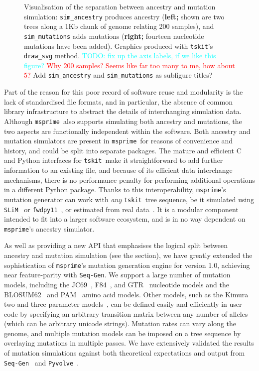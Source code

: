 \documentclass{article}
\newcommand{\msprime}[0]{\texttt{msprime}}
\newcommand{\tskit}[0]{\texttt{tskit}}
\newcommand{\SLiM}[0]{\texttt{SLiM}}
\newcommand{\fwdpy}[0]{\texttt{fwdpy11}}
\newcommand{\SeqGen}[0]{\texttt{Seq-Gen}}
\newcommand{\Pyvolve}[0]{\texttt{Pyvolve}}
\newcommand{\jkcomment}[1]{\textcolor{red}{#1}}
\newcommand{\plrcomment}[1]{\textcolor{cyan}{#1}}
\newcommand{\grgcomment}[1]{\textcolor{yellow!60!red}{#1}}
\begin{document}
\begin{figure}
    \caption{
        \label{fig-mutated-trees}
        Visualisation of the separation between ancestry and mutation simulation:
        \texttt{sim\_ancestry} produces ancestry
        (\textbf{left;} shown are two trees along a 1Kb chunk of genome
        relating 200 samples),
        and \texttt{sim\_mutations} adds mutations
        (\textbf{right;} fourteen nucleotide mutations have been added).
        Graphics produced with \tskit's \texttt{draw\_svg} method.
        \plrcomment{TODO: fix up the axis labels, if we like this figure?}
        \jkcomment{Why 200 samples? Seems like far too many to me, how about 5?}
        \grgcomment{Add \texttt{sim\_ancestry} and \texttt{sim\_mutations} as subfigure titles?}
    }
\end{figure}

Part of the reason for this poor record of software reuse and modularity is the
lack of standardised file formats, and in particular, the absence of common
library infrastructure to abstract the details of interchanging simulation
data. Although \msprime\ also supports simulating both ancestry and mutations,
the two aspects are functionally independent within the software.
Both ancestry and mutation simulators are present in \msprime\
for reasons of convenience and history,
and could be split into separate packages.
The mature and efficient C and Python interfaces for
\tskit\ make it straightforward to add further information to
an existing file, and because of its efficient data interchange mechanisms,
there is no performance penalty for performing additional operations
in a different Python package.
Thanks to this interoperability, \msprime's
mutation generator can work with \emph{any} \tskit\ tree sequence,
be it simulated using \SLiM~\citep{haller2019slim} or
\fwdpy~\citep{thornton2014cpp}, or estimated from real
data~\citep{kelleher2019inferring,speidel2019method,wohns2021unified}.
It is a modular
component intended to fit into a larger software ecosystem, and
is in no way dependent on \msprime's ancestry simulator.

As well as providing a new API
that emphasises the logical split between ancestry and mutation simulation
(see the \nameref{sec-sim-interface} section),
we have greatly extended the sophistication of
\msprime's mutation generation engine for version 1.0,
achieving near feature-parity with \SeqGen.
We support a large number of mutation models, including the
JC69~\citep{jukes1969evolution},
F84~\citep{felsenstein1996hidden},
and GTR~\citep{tavare1986some} nucleotide models
and the BLOSUM62~\citep{henikoff1992amino}
and PAM~\citep{dayhoff1978} amino acid models.
Other models, such as the Kimura two and three
parameter models~\citep{kimura1980simple,kimura1981estimation},
can be defined easily and efficiently in
user code by specifying an arbitrary transition matrix between
any number of alleles (which can be arbitrary unicode strings).
Mutation rates can vary along the genome, and multiple mutation
models can be imposed on a tree sequence by overlaying mutations
in multiple passes.
We have extensively validated the results of mutation simulations
against both theoretical expectations and output from
\SeqGen~\citep{rambaut1997seq} and
\Pyvolve~\citep{spielman2015pyvolve}.
\end{document}
